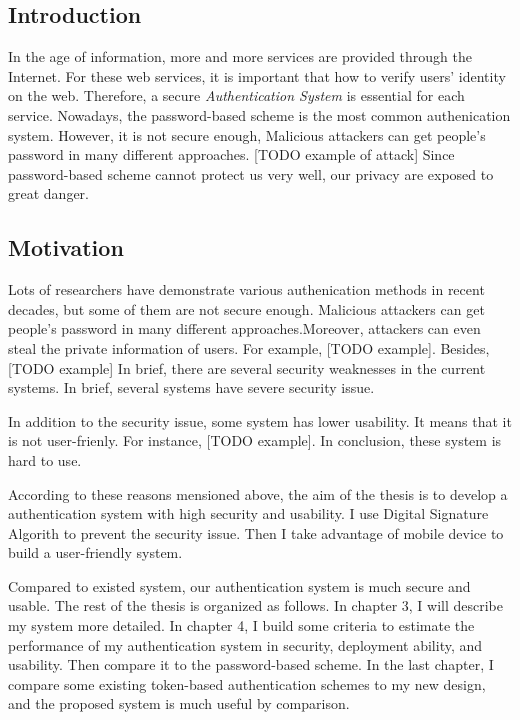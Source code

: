 
\begin{CJK}{Bg5}{bsmi}



\chapter{Introduction}

In the age of information, more and more services are provided through the Internet. For these web services, it is important that how to verify users' identity on the web. Therefore, a secure \emph{Authentication System} is essential for each service. Nowadays, the password-based scheme is the most common authenication system. However, it is not secure enough, Malicious attackers can get people's password in many different approaches. [TODO example of attack] Since password-based scheme cannot protect us very well, our privacy are exposed to great danger.

\section{Motivation}

Lots of researchers have demonstrate various authenication methods in recent decades, but some of them are not secure enough. Malicious attackers can get people's password in many different approaches.Moreover, attackers can even steal the private information of users. For example, [TODO example]. Besides, [TODO example] In brief, there are several security weaknesses in the current systems. In brief, several systems have severe security issue.

In addition to the security issue, some system has lower usability. It means that it is not user-frienly. For instance, [TODO example]. In conclusion, these system is hard to use.

According to these reasons mensioned above, the aim of the thesis is to develop a authentication system with high security and usability. I use Digital Signature Algorith to prevent the security issue. Then I take advantage of mobile device to build a user-friendly system.

Compared to existed system, our authentication system is much secure and usable. The rest of the thesis is organized as follows. In chapter 3, I will describe my system more detailed. In chapter 4, I build some criteria to estimate the performance of my authentication system in security, deployment ability, and usability. Then compare it to the password-based scheme. In the last chapter, I compare some existing token-based authentication schemes to my new design, and the proposed system is much useful by comparison.

\end{CJK}
